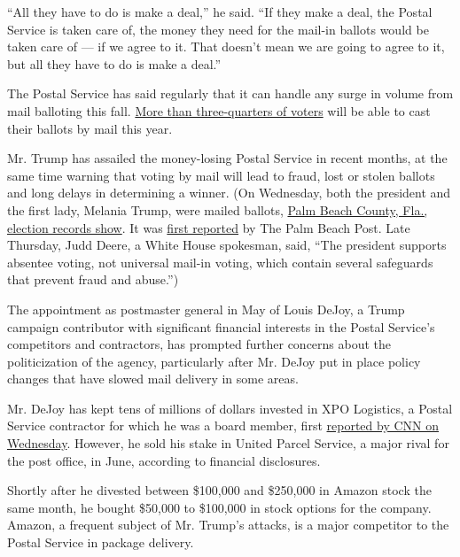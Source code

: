 ``All they have to do is make a deal,'' he said. ``If they make a deal,
the Postal Service is taken care of, the money they need for the mail-in
ballots would be taken care of --- if we agree to it. That doesn't mean
we are going to agree to it, but all they have to do is make a deal.''

The Postal Service has said regularly that it can handle any surge in
volume from mail balloting this fall.
\href{https://www.nytimes3xbfgragh.onion/interactive/2020/08/11/us/politics/vote-by-mail-us-states.html}{More
than three-quarters of voters} will be able to cast their ballots by
mail this year.

Mr. Trump has assailed the money-losing Postal Service in recent months,
at the same time warning that voting by mail will lead to fraud, lost or
stolen ballots and long delays in determining a winner. (On Wednesday,
both the president and the first lady, Melania Trump, were mailed
ballots, \href{https://www.pbcelections.org/Voters/Vote-By-Mail}{Palm
Beach County, Fla., election records show}. It was
\href{https://www.palmbeachpost.com/news/20200813/floridas-most-famous-mail-in-voter-will-do-it-again-trump-requests-ballot}{first
reported} by The Palm Beach Post. Late Thursday, Judd Deere, a White
House spokesman, said, ``The president supports absentee voting, not
universal mail-in voting, which contain several safeguards that prevent
fraud and abuse.'')

The appointment as postmaster general in May of Louis DeJoy, a Trump
campaign contributor with significant financial interests in the Postal
Service's competitors and contractors, has prompted further concerns
about the politicization of the agency, particularly after Mr. DeJoy put
in place policy changes that have slowed mail delivery in some areas.

Mr. DeJoy has kept tens of millions of dollars invested in XPO
Logistics, a Postal Service contractor for which he was a board member,
first
\href{https://www.cnn.com/2020/08/12/politics/postal-service-dejoy-conflicts-amazon-trades-xpo-stake/index.html}{reported
by CNN on Wednesday}. However, he sold his stake in United Parcel
Service, a major rival for the post office, in June, according to
financial disclosures.

Shortly after he divested between \$100,000 and \$250,000 in Amazon
stock the same month, he bought \$50,000 to \$100,000 in stock options
for the company. Amazon, a frequent subject of Mr. Trump's attacks, is a
major competitor to the Postal Service in package delivery.

